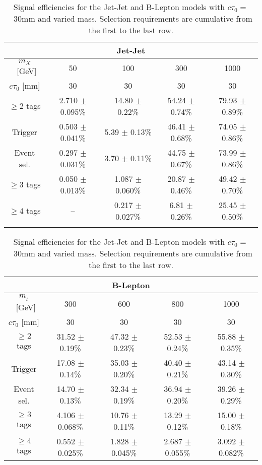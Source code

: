 \begin{table}[tb]
\begin{center}
  \caption{ Signal efficiencies for the Jet-Jet and B-Lepton models
    with $c\tau_0=$~30mm and varied mass. Selection requirements are cumulative from
    the first to the last row. \label{tab:cutflow_30mm}}
\begin{tabular}{ccccc}
\multicolumn{5}{c}{\textbf{Jet-Jet}} \\
 \hline 
 $m_{X}$~[GeV] & 50 & 100 & 300 & 1000  \\ 
 $c\tau_0$ [mm] & 30 & 30 & 30 & 30  \\ 
 \hline 
 $\geq 2$ tags &        2.710 $\pm$ 0.095\% &   14.80 $\pm$ 0.22\% &    54.24 $\pm$ 0.74\% &    79.93 $\pm$ 0.89\%  \\ 
 Trigger &     0.503 $\pm$ 0.041\% &        5.39 $\pm$ 0.13\% &    46.41 $\pm$ 0.68\% &    74.05 $\pm$ 0.86\%\\ 
 Event sel. &   0.297 $\pm$ 0.031\% &  3.70 $\pm$ 0.11\% &    44.75 $\pm$ 0.67\% &    73.99 $\pm$ 0.86\%\\ 
 $\geq 3$ tags &     0.050 $\pm$ 0.013\% &  1.087 $\pm$ 0.060\% &  20.87 $\pm$ 0.46\% &    49.42 $\pm$ 0.70\%\\ 
 $\geq 4$ tags &     -- &  0.217 $\pm$ 0.027\% &  6.81 $\pm$ 0.26\% &    25.45 $\pm$ 0.50\%  \\ 
\\
\end{tabular}
\begin{tabular}{ccccc}
\multicolumn{5}{c}{\textbf{B-Lepton}}\\
\hline
 $m_{\tilde{t}}$~[GeV] & 300 & 600 & 800 & 1000 \\
 $c\tau_0$ [mm] & 30 & 30 & 30 & 30 \\
 \hline
 $\geq 2$ tags &        31.52 $\pm$ 0.19\% &    47.32 $\pm$ 0.23\% &    52.53 $\pm$ 0.24\% &    55.88 $\pm$ 0.35\% \\ 
Trigger &     17.08 $\pm$ 0.14\% &        35.03 $\pm$ 0.20\% &    40.40 $\pm$ 0.21\% &    43.14 $\pm$ 0.30\% \\ 
Event sel. &   14.70 $\pm$ 0.13\% &  32.34 $\pm$ 0.19\% &    36.94 $\pm$ 0.20\% &    39.26 $\pm$ 0.29\% \\ 
$\geq 3$ tags &     4.106 $\pm$ 0.068\% &       10.76 $\pm$ 0.11\% &    13.29 $\pm$ 0.12\% &    15.00 $\pm$ 0.18\% \\ 
$\geq 4$ tags &     0.552 $\pm$ 0.025\% &       1.828 $\pm$ 0.045\% &   2.687 $\pm$ 0.055\% &   3.092 $\pm$ 0.082\% \\ 
\end{tabular}
\end{center}
\end{table}

